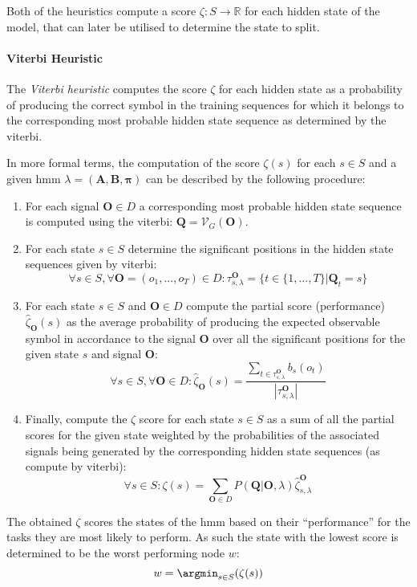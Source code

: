 Both of the heuristics compute a score $\zeta:S \rightarrow \mathbb{R}$ for each hidden state of the model, that can later be utilised to determine the state to split.

\paragraph{Viterbi Heuristic}
The \emph{Viterbi heuristic} computes the score $\zeta$ for each hidden state as a probability of producing the correct symbol in the training sequences for which it belongs to the corresponding most probable hidden state sequence as determined by the \gls{viterbi}.

In more formal terms, the computation of the score $\zeta(s)$ for each $s \in S$ and a given \gls{hmm} $\lambda = (\mathbf{A}, \mathbf{B}, \boldsymbol{\pi})$ can be described by the following procedure:
\begin{enumerate}
	\item For each signal $\mathbf{O}\in D$ a corresponding most probable hidden state sequence is computed using the \gls{viterbi}: $\mathbf{Q}=\mathcal{V}_G(\mathbf{O})$.
	\item For each state $s\in S$ determine the significant positions in the hidden state sequences given by \gls{viterbi}:
	$$\forall s\in S,\forall \mathbf{O}=(o_1, ..., o_T)\in D: \tau_{s, \lambda}^\mathbf{O}=\{t\in\{1, ..., T\}|\mathbf{Q}_t=s\}$$
	\item For each state $s \in S$  and $\mathbf{O}\in D$ compute the partial score (performance) $\hat\zeta_{\mathbf{O}}(s)$ as the average probability of producing the expected observable symbol in accordance to the signal $\mathbf{O}$ over all the significant positions for the given state $s$ and signal $\mathbf{O}$:
	$$\forall s\in S,\forall \mathbf{O}\in D: \hat{\zeta}_{\mathbf{O}}(s) = \frac{\sum_{t\in\tau_{s, \lambda}^{\mathbf{O}}}b_s(o_t)}{|\tau_{s, \lambda}^{\mathbf{O}}|}$$
	\item Finally, compute the $\zeta$ score for each state $s\in S$ as a sum of all the partial scores for the given state weighted by the probabilities of the associated signals being generated by the corresponding hidden state sequences (as compute by \gls{viterbi}):
	$$\forall s\in S: \zeta(s)=\sum_{\mathbf{O}\in D}P(\mathbf{Q}|\mathbf{O}, \lambda)\hat\zeta_{s, \lambda}^{\mathbf{O}}$$
\end{enumerate}

The obtained $\zeta$ scores the states of the \gls{hmm} based on their ``performance'' for the tasks they are most likely to perform. As such the state with the lowest score is determined to be the worst performing node $w$: $$w = \argmin_{s\in S}(\zeta(s))$$

